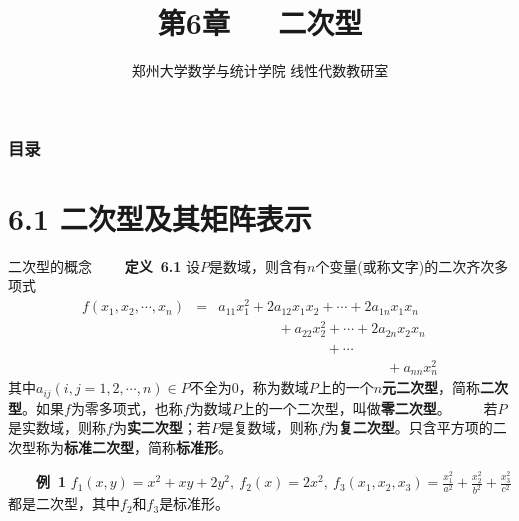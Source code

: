 \documentclass[compress,mathserif,cjk]{beamer}
\title{\textsc{第6章\ \ \ 二次型}}
\author{郑州大学数学与统计学院 线性代数教研室}
\date{}
\theoremstyle{remark}
\numberwithin{equation}{section}
\newcommand{\hei}{\bf}      %
\begin{document}
\begin{CJK}{UTF8}{gbsn}
\frame{\titlepage}

\begin{frame}\frametitle{目录}
 \tableofcontents
\end{frame}

\section[6.1]{6.1 二次型及其矩阵表示}

\begin{frame}{二次型的概念}
 \ \ \ \ {\hei 定义~6.1} 设$P$是数域，则含有$n$个变量(或称文字)的二次齐次多项式
 \begin{eqnarray*}
 f(x_1,x_2,\cdots,x_n)&=&a_{11}x_1^2+2a_{12}x_1x_2+\cdots+2a_{1n}x_1x_n\\
 &&\hspace{4em}~+a_{22}x_2^2+\cdots+2a_{2n}x_2x_n\\
 &&\hspace{7em}~~~+\cdots\\
 &&\hspace{12em}+a_{nn}x_n^2
 \end{eqnarray*}
 其中$a_{ij}(i,j=1,2,\cdots,n)\in P$不全为0，称为数域$P$上的一个$n${\hei 元二次型}，简称{\hei 二次型}。如果$f$为零多项式，也称$f$为数域$P$上的一个二次型，叫做{\hei 零二次型}。
 \pause\vskip 5pt
 \ \ \ \ 若$P$是实数域，则称$f$为{\hei 实二次型}；若$P$是复数域，则称$f$为{\hei 复二次型}。只含平方项的二次型称为{\hei 标准二次型}，简称{\hei 标准形}。
\vskip 50pt\
\end{frame}

\begin{frame}
\ \ \ \ {\hei 例~1} $f_1(x,y)=x^2+xy+2y^2,~f_2(x)=2x^2,~f_3(x_1,x_2,x_3)=\frac{x_1^2}{a^2}+\frac{x_2^2}{b^2}+\frac{x_3^2}{c^2}$都是二次型，其中$f_2$和$f_3$是标准形。

\end{frame}


\end{CJK}
\end{document}
